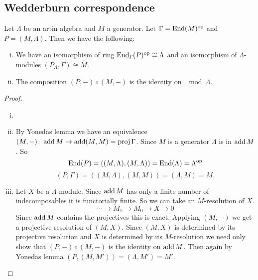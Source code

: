 \subsection{Wedderburn correspondence}\label{sec:wedderburn_correspondence}
\begin{prop} \label{prop:hom_generator_equivalence}
Let $\Lambda$ be an artin algebra and $M$ a generator. Let $\Gamma = \operatorname{End}(M)^{\operatorname{op}}$ and $P=(M, \Lambda)$. Then we have the following:
\begin{enumerate}[i)]
	\item We have an isomorphism of ring $\operatorname{End}_\Gamma(P)^{\operatorname{op}} \cong \Lambda$ and an isomorphism of $\Lambda$-modules $(P_\Lambda, \Gamma) \cong M$.
	\item The composition $(P,-)\circ (M,-)$ is the identity on $\mod\Lambda$.
\end{enumerate}

\begin{proof}
	\begin{enumerate}[i)]
		\item[]
		\item By Yonedas lemma we have an equivalence $(M,-)\colon\operatorname{add} M \to \operatorname{add} (M,M)=\operatorname{proj}\Gamma$. Since $M$ is a generator $\Lambda$ is in $\operatorname{add} M$. So $$\operatorname{End}(P)=((M,\Lambda), (M,\Lambda)) = \operatorname{End}(\Lambda)=\Lambda^{\operatorname{op}}$$  $$(P,\Gamma)=((M,\Lambda),(M,M))=(\Lambda,M)=M.$$
		\item Let $X$ be a $\Lambda$-module. Since $\operatorname{add} M$ has only a finite number of indecomposables it is functorially finite. So we can take an $M$-resolution of $X$.
		$$\cdots \to M_1 \to M_0 \to X \to 0$$
		Since $\operatorname{add} M$ contains the projectives this is exact. Applying $(M,-)$ we get a projective resolution of $(M,X)$. Since $(M, X)$ is determined by its projective resolution and $X$ is determined by its $M$-resolution we need only show that $(P,-)\circ (M,-)$ is the identity on $\operatorname{add} M$. Then again by Yonedas lemma $(P, (M, M')) = (\Lambda, M')=M'$.
	\end{enumerate}
\end{proof}
\end{prop}

